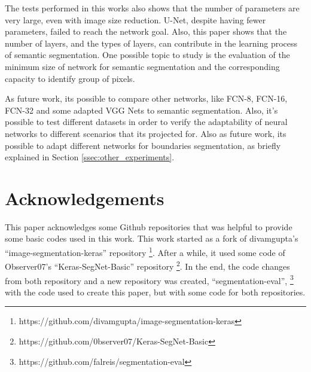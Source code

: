 \documentclass[10pt,twocolumn,letterpaper]{article}
\begin{document}
The tests performed in this works also shows that the number of parameters are very large, even with image size reduction. U-Net, despite having fewer parameters, failed to reach the network goal. Also, this paper shows that the number of layers, and the types of layers, can contribute in the learning process of semantic segmentation. One possible topic to study is the evaluation of the minimum size of network for semantic segmentation and the corresponding capacity to identify group of pixels.

As future work, its possible to compare other networks, like FCN-8, FCN-16, FCN-32 \cite{FULLY_CONVOLU} and some adapted VGG Nets \cite{VGGNET} to semantic segmentation. Also, it's possible to test different datasets in order to verify the adaptability of neural networks to different scenarios that its projected for. Also as future work, its possible to adapt different networks for boundaries segmentation, as briefly explained in Section \ref{ssec:other_experiments}.

\section{Acknowledgements} \label{sec:acknowledgements}

This paper acknowledges some Github repositories that was helpful to provide some basic codes used in this work. This work started as a fork of divamgupta's ``image-segmentation-keras'' repository \footnote{https://github.com/divamgupta/image-segmentation-keras}. After a while, it used some code of Observer07's ``Keras-SegNet-Basic'' repository \footnote{https://github.com/0bserver07/Keras-SegNet-Basic}. In the end, the code changes from both repository and a new repository was created, ``segmentation-eval'', \footnote{https://github.com/falreis/segmentation-eval} with the code used to create this paper, but with some code for both repositories.

{\small


}
\end{document}
